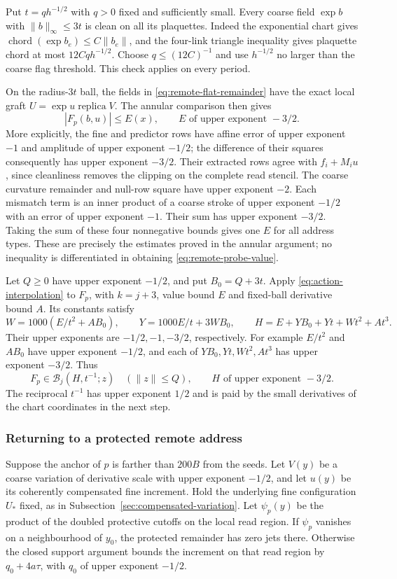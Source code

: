Put $t=q h^{-1/2}$ with $q>0$ fixed and sufficiently small.
Every coarse field $\exp b$ with $\|b\|_\infty\le3t$ is clean
on all its plaquettes. Indeed the exponential chart gives
$\operatorname{chord}(\exp b_e)\le C\|b_e\|$, and the four-link
triangle inequality gives plaquette chord at most $12Cq h^{-1/2}$.
Choose $q\le(12C)^{-1}$ and use $h^{-1/2}$ no larger than the
coarse flag threshold. This check applies on every period.

On the radius-$3t$ ball, the fields in
\eqref{eq:remote-flat-remainder} have the exact local graft
$U=\exp u\operatorname{replica}V$. The annular comparison then
gives
\begin{equation}\label{eq:remote-probe-value}
 |F_p(b,u)|\le E(x),\qquad E\text{ of upper exponent }-3/2.
\end{equation}
More explicitly, the fine and predictor rows have affine error of
upper exponent $-1$ and amplitude of upper exponent $-1/2$;
the difference of their squares consequently has upper exponent
$-3/2$. Their extracted rows agree with $f_i+M_i u$, since
cleanliness removes the clipping on the complete read stencil.
The coarse curvature remainder and null-row square have upper
exponent $-2$. Each mismatch term is an inner product of a coarse
stroke of upper exponent $-1/2$ with an error of upper exponent
$-1$. Their sum has upper exponent $-3/2$. Taking the sum of
these four nonnegative bounds gives one $E$ for all address types.
These are precisely the estimates proved in the annular argument;
no inequality is differentiated in obtaining
\eqref{eq:remote-probe-value}.

Let $Q\ge0$ have upper exponent $-1/2$, and put $B_0=Q+3t$.
Apply \eqref{eq:action-interpolation} to $F_p$, with $k=j+3$,
value bound $E$ and fixed-ball derivative bound $A$. Its constants
satisfy
\[
 W=1000(E/t^2+AB_0),\qquad
 Y=1000E/t+3WB_0,\qquad
 H=E+YB_0+Yt+Wt^2+At^3.
\]
Their upper exponents are $-1/2,-1,-3/2$, respectively. For example
$E/t^2$ and $AB_0$ have upper exponent $-1/2$, and each of
$YB_0,Yt,Wt^2,At^3$ has upper exponent $-3/2$. Thus
\begin{equation}\label{eq:remote-probe-jets}
 F_p\in\mathcal B_j(H,t^{-1};z)
 \quad(\|z\|\le Q),\qquad H\text{ of upper exponent }-3/2.
\end{equation}
The reciprocal $t^{-1}$ has upper exponent $1/2$ and is paid by
the small derivatives of the chart coordinates in the next step.

\subsubsection{Returning to a protected remote address}
Suppose the anchor of $p$ is farther than $200B$ from the seeds.
Let $V(y)$ be a coarse variation of derivative scale with upper
exponent $-1/2$, and let $u(y)$ be its coherently compensated fine
increment. Hold the underlying fine configuration $U_*$ fixed,
as in Subsection~\ref{sec:compensated-variation}. Let $\psi_p(y)$
be the product of the doubled protective cutoffs on the local
read region. If $\psi_p$ vanishes on a neighbourhood of $y_0$,
the protected remainder has zero jets there. Otherwise the closed
support argument bounds the increment on that read region by
$q_0+4a\tau$, with $q_0$ of upper exponent $-1/2$.

